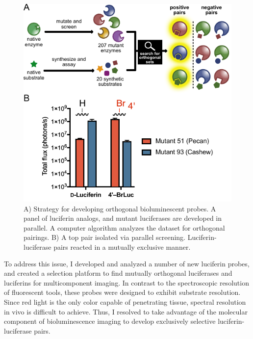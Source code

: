 \documentclass{F32}
\begin{document}
\begin{figure}
\begin{centering}
\includegraphics[width=\textwidth]{Previous_Research_figs/algorithmv2.pdf}
\end{centering}
\footnotesize
\caption{\label{figure:algorithm}
A) Strategy for developing orthogonal bioluminescent probes. A panel of luciferin analogs, and mutant luciferases are developed in parallel. A computer algorithm analyzes the dataset for orthogonal pairings. B) A top pair isolated via parallel screening. Luciferin-luciferase pairs reacted in a mutually exclusive manner.
}
\end{figure}

To address this issue, I developed and analyzed a number of new luciferin probes, and created a selection platform to find mutually orthogonal luciferases and luciferins for multicomponent imaging. In contrast to the spectroscopic resolution of fluorescent tools, these probes were designed to exhibit substrate resolution. Since red light is the only color capable of penetrating tissue, spectral resolution in vivo is difficult to achieve. Thus, I resolved to take advantage of the molecular component of bioluminescence imaging to develop exclusively selective luciferin-luciferase pairs.
\end{document}
